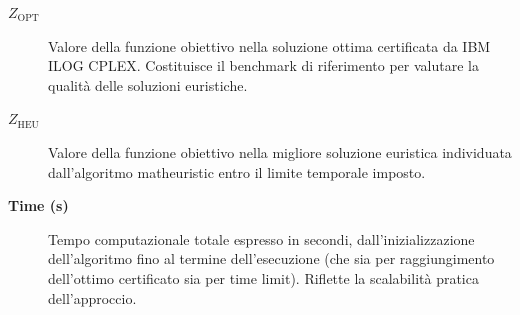 \documentclass[12pt,a4paper,openright,twoside]{book}
\begin{document}
\begin{description}
    \item[\(Z_{\text{OPT}}\)] Valore della funzione obiettivo nella soluzione ottima certificata da IBM ILOG CPLEX. Costituisce il benchmark di riferimento per valutare la qualità delle soluzioni euristiche.
    
    \item[\(Z_{\text{HEU}}\)] Valore della funzione obiettivo nella migliore soluzione euristica individuata dall'algoritmo matheuristic entro il limite temporale imposto.
    

    \item[\textbf{Time (s)}] Tempo computazionale totale espresso in secondi, dall'inizializzazione dell'algoritmo fino al termine dell'esecuzione (che sia per raggiungimento dell'ottimo certificato sia per time limit). Riflette la scalabilità pratica dell'approccio.
\end{description}
\end{document}
